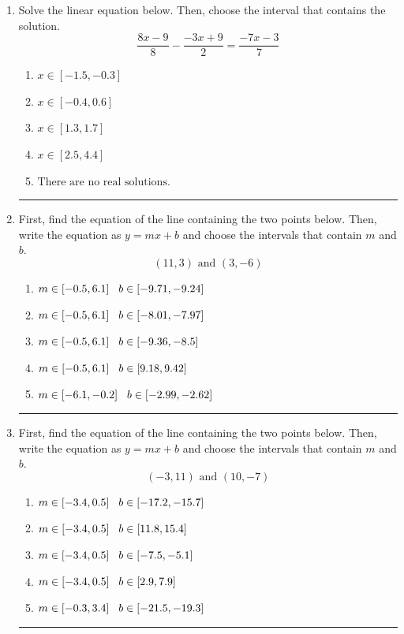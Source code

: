 \documentclass[14pt]{extbook}
\newcommand{\litem}[1]{\item#1\hspace*{-1cm}\rule{\textwidth}{0.4pt}}
\begin{document}
\begin{enumerate}
\litem{
Solve the linear equation below. Then, choose the interval that contains the solution.\[ \frac{8x -9}{8} - \frac{-3x + 9}{2} = \frac{-7x -3}{7} \]\begin{enumerate}[label=\Alph*.]
\item \( x \in [-1.5, -0.3] \)
\item \( x \in [-0.4, 0.6] \)
\item \( x \in [1.3, 1.7] \)
\item \( x \in [2.5, 4.4] \)
\item \( \text{There are no real solutions.} \)

\end{enumerate} }
\litem{
First, find the equation of the line containing the two points below. Then, write the equation as $ y=mx+b $ and choose the intervals that contain $m$ and $b$.\[ (11, 3) \text{ and } (3, -6) \]\begin{enumerate}[label=\Alph*.]
\item \( m \in [-0.5, 6.1] \hspace*{3mm} b \in [-9.71, -9.24] \)
\item \( m \in [-0.5, 6.1] \hspace*{3mm} b \in [-8.01, -7.97] \)
\item \( m \in [-0.5, 6.1] \hspace*{3mm} b \in [-9.36, -8.5] \)
\item \( m \in [-0.5, 6.1] \hspace*{3mm} b \in [9.18, 9.42] \)
\item \( m \in [-6.1, -0.2] \hspace*{3mm} b \in [-2.99, -2.62] \)

\end{enumerate} }
\litem{
First, find the equation of the line containing the two points below. Then, write the equation as $ y=mx+b $ and choose the intervals that contain $m$ and $b$.\[ (-3, 11) \text{ and } (10, -7) \]\begin{enumerate}[label=\Alph*.]
\item \( m \in [-3.4, 0.5] \hspace*{3mm} b \in [-17.2, -15.7] \)
\item \( m \in [-3.4, 0.5] \hspace*{3mm} b \in [11.8, 15.4] \)
\item \( m \in [-3.4, 0.5] \hspace*{3mm} b \in [-7.5, -5.1] \)
\item \( m \in [-3.4, 0.5] \hspace*{3mm} b \in [2.9, 7.9] \)
\item \( m \in [-0.3, 3.4] \hspace*{3mm} b \in [-21.5, -19.3] \)


\end{enumerate}}
\end{enumerate}
\end{document}
